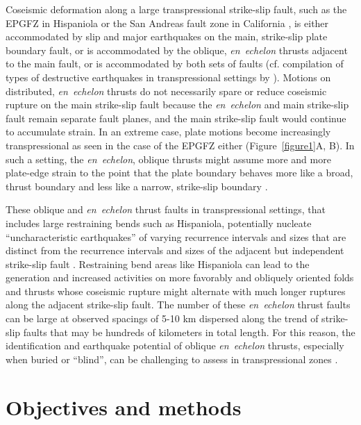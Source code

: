 \documentclass[linenumbers,draft]{agujournal}
\begin{document}
Coseismic deformation along a large transpressional strike-slip fault, such as the EPGFZ \citep{calais2002strain} in Hispaniola or the San Andreas fault zone in California \citep{segall1990surface}, is either accommodated by slip and major earthquakes on the main, strike-slip plate boundary fault, or is accommodated by the oblique, \textit{en~echelon} thrusts adjacent to the main fault, or is accommodated by both sets of faults (cf. compilation of types of destructive earthquakes in transpressional settings by \citet{hayes2010complex}). Motions on distributed, \textit{en~echelon} thrusts do not necessarily spare or reduce coseismic rupture on the main strike-slip fault because the \textit{en~echelon} and main strike-slip fault remain separate fault planes, and the main strike-slip fault would continue to accumulate strain. In an extreme case, plate motions become increasingly transpressional as seen in the case of the EPGFZ either (Figure~\ref{figure1}A, B). In such a setting, the \textit{en~echelon}, oblique thrusts might assume more and more plate-edge strain to the point that the plate boundary behaves more like a broad, thrust boundary and less like a narrow, strike-slip boundary \citep{mount1987state}.

These oblique and \textit{en~echelon} thrust faults in transpressional settings, that includes large restraining bends such as Hispaniola, potentially nucleate ``uncharacteristic earthquakes'' of varying recurrence intervals and sizes that are distinct from the recurrence intervals and sizes of the adjacent but independent strike-slip fault \citep{Fielding2013}. Restraining bend areas like Hispaniola can lead to the generation and increased activities on more favorably and obliquely oriented folds and thrusts whose coseismic rupture might alternate with much longer ruptures along the adjacent strike-slip fault. The number of these \textit{en~echelon} thrust faults can be large at observed spacings of 5-10 km dispersed along the trend of strike-slip faults that may be hundreds of kilometers in total length. For this reason, the identification and earthquake potential of oblique \textit{en~echelon} thrusts, especially when buried or ``blind'', can be challenging to assess in transpressional zones \citep{frankel2011seismic}.

\section{Objectives and methods}
\end{document}
